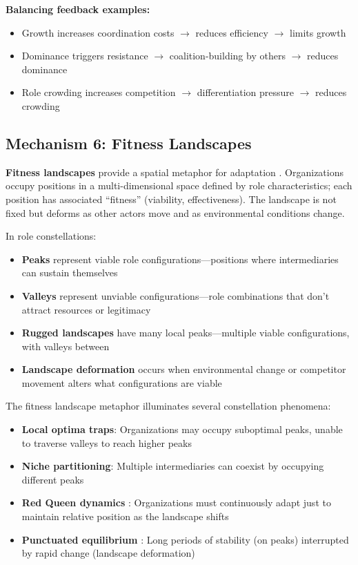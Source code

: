 \documentclass[../main.tex]{subfiles}
\begin{document}
\textbf{Balancing feedback examples:}
\begin{itemize}[leftmargin=*, itemsep=0.1em]
\item Growth increases coordination costs $\rightarrow$ reduces efficiency $\rightarrow$ limits growth
\item Dominance triggers resistance $\rightarrow$ coalition-building by others $\rightarrow$ reduces dominance
\item Role crowding increases competition $\rightarrow$ differentiation pressure $\rightarrow$ reduces crowding
\end{itemize}

\subsection{Mechanism 6: Fitness Landscapes}

\textbf{Fitness landscapes} provide a spatial metaphor for adaptation \cite{kauffman1993origins}. Organizations occupy positions in a multi-dimensional space defined by role characteristics; each position has associated ``fitness'' (viability, effectiveness). The landscape is not fixed but deforms as other actors move and as environmental conditions change.

In role constellations:
\begin{itemize}[leftmargin=*, itemsep=0.2em]
\item \textbf{Peaks} represent viable role configurations---positions where intermediaries can sustain themselves
\item \textbf{Valleys} represent unviable configurations---role combinations that don't attract resources or legitimacy
\item \textbf{Rugged landscapes} have many local peaks---multiple viable configurations, with valleys between
\item \textbf{Landscape deformation} occurs when environmental change or competitor movement alters what configurations are viable
\end{itemize}

The fitness landscape metaphor illuminates several constellation phenomena:
\begin{itemize}[leftmargin=*, itemsep=0.2em]
\item \textbf{Local optima traps}: Organizations may occupy suboptimal peaks, unable to traverse valleys to reach higher peaks
\item \textbf{Niche partitioning}: Multiple intermediaries can coexist by occupying different peaks
\item \textbf{Red Queen dynamics} \cite{valen1973red}: Organizations must continuously adapt just to maintain relative position as the landscape shifts
\item \textbf{Punctuated equilibrium} \cite{eldredge1972punctuated}: Long periods of stability (on peaks) interrupted by rapid change (landscape deformation)
\end{itemize}
\end{document}

